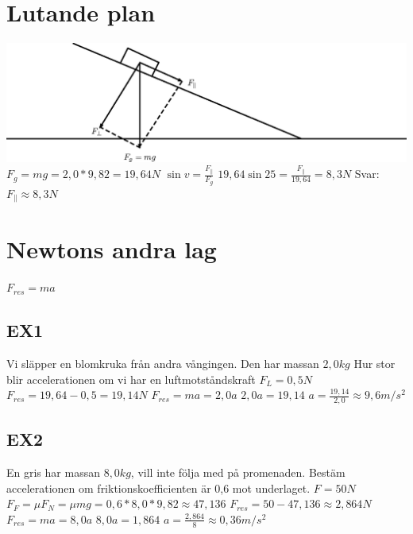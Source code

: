 \documentclass[a4paper,11pt]{article}
\begin{document}
\begin{flushleft}
\section{Lutande plan}
\includegraphics{lutandeplan.eps}\newline
$ F_g = mg = 2,0*9,82 = 19,64 N $\newline
$ \sin v = \frac{F_{\parallel}}{F_g} $\newline
$ 19,64 \sin 25 = \frac{F_{\parallel}}{19,64} = 8,3 N $\newline\newline
Svar: $ F_{\parallel} \approx 8,3N $
\section{Newtons andra lag}
$ F_{res} = ma $
\subsection{EX1}
Vi släpper en blomkruka från andra vångingen. Den har massan $2,0kg$
Hur stor blir accelerationen om vi har en luftmotståndskraft $ F_L = 0,5 N $\newline
$ F_{res} = 19,64 - 0,5 = 19,14 N $\newline
$ F_{res} = ma = 2,0a $\newline
$ 2,0a = 19,14 $\newline
$ a = \frac{19,14}{2,0} \approx 9,6 m/s^2 $
\subsection{EX2}
En gris har massan $8,0 kg$, vill inte följa med på promenaden. Bestäm accelerationen om friktionskoefficienten är 0,6 mot underlaget.\newline
$ F = 50N $\newline
$ F_F = \mu F_N = \mu mg = 0,6*8,0*9,82 \approx 47,136 $\newline
$ F_{res} = 50-47,136 \approx 2,864 N $
$ F_{res} = ma = 8,0a $\newline
$ 8,0a = 1,864 $\newline
$ a = \frac{2,864}{8} \approx 0,36m/s^2 $

\end{flushleft}
\end{document}
